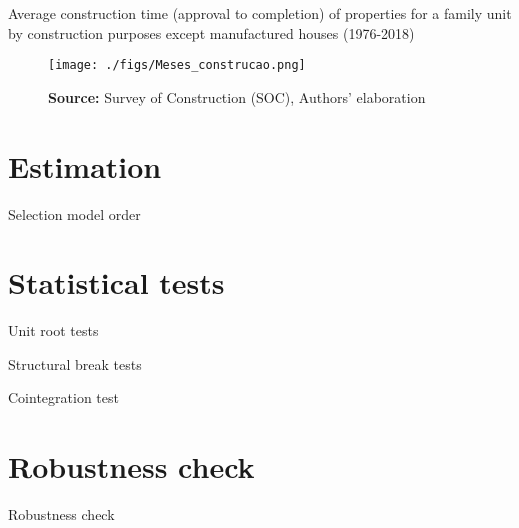 \documentclass[10pt]{beamer}
\begin{document}
\begin{frame}{Average construction time (approval to completion) of properties for a family unit by construction purposes except manufactured houses (1976-2018) \hyperlink{OwnClarification}{}}
\label{constructionPlot}
\begin{figure}[H]
	\centering
	\texttt{[image: ./figs/Meses\_construcao.png]}
	\caption*{\textbf{Source:} Survey of Construction (SOC), Authors' elaboration}
\end{figure}

\end{frame}

\section{Estimation}

\begin{frame}{Selection model order}
\scriptsize{}
\end{frame}

\section{Statistical tests}


\begin{frame}{Unit root tests \hyperlink{DataInspection}{}}
\label{UnitTest}
\scriptsize{}
\end{frame}


\begin{frame}{Structural break tests \hyperlink{DataInspection}{}}
\label{StructTest}
\scriptsize{}
\end{frame}


\begin{frame}{Cointegration test \hyperlink{DataInspection}{}}
\label{CointTest}
\scriptsize{}
\end{frame}




\section{Robustness check}
\begin{frame}{Robustness check \hyperlink{back}{}}
\label{robust_frame}
	     
\end{frame}
\end{document}
